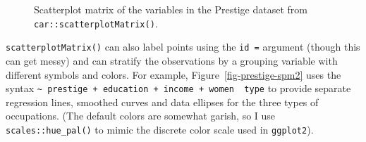 \documentclass[
  letterpaper,
  10pt,
  krantz2]{krantz}
\begin{document}
\begin{figure}[H]


\caption{\label{fig-prestige-spm1}Scatterplot matrix of the variables in
the Prestige dataset from \texttt{car::scatterplotMatrix()}.}

\end{figure}%

\texttt{scatterplotMatrix()} can also label points using the
\texttt{id\ =} argument (though this can get messy) and can stratify the
observations by a grouping variable with different symbols and colors.
For example, Figure~\ref{fig-prestige-spm2} uses the syntax
\texttt{\textasciitilde{}\ prestige\ +\ education\ +\ income\ +\ women\ \textbar{}\ type}
to provide separate regression lines, smoothed curves and data ellipses
for the three types of occupations. (The default colors are somewhat
garish, so I use \texttt{scales::hue\_pal()} to mimic the discrete color
scale used in \texttt{ggplot2}).
\end{document}
